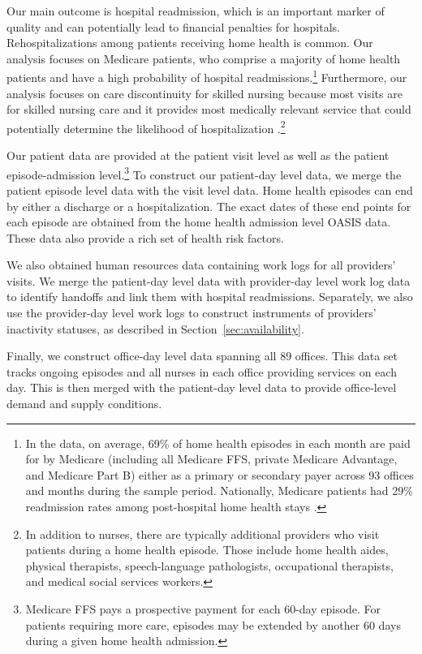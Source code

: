 \documentclass[final,12pt, notitlepage]{article}
\begin{document}
Our main outcome is hospital readmission, which is an important marker of quality and can potentially lead to financial penalties for hospitals. Rehospitalizations among patients receiving home health is common. Our analysis focuses on Medicare patients, who comprise a majority of home health patients and have a high probability of hospital readmissions.\footnote{In the data, on average, 69\% of home health episodes in each month are paid for by Medicare (including all Medicare FFS, private Medicare Advantage, and Medicare Part B) either as a primary or secondary payer across 93 offices and months during the sample period.
Nationally, Medicare patients had 29\% readmission rates among post-hospital home health stays \citep{MedPAC2014hh}.
}
Furthermore, our analysis focuses on care discontinuity for skilled nursing because most visits are for skilled nursing care and it provides most medically relevant service that could potentially determine the likelihood of hospitalization \citep{Russell2011}.\footnote{In addition to nurses, there are typically additional providers who visit patients during a home health episode. Those include home health aides, physical therapists, speech-language pathologists, occupational therapists, and medical social services workers.
}

Our patient data are provided at the patient visit level as well as the patient episode-admission level.\footnote{Medicare FFS pays a prospective payment for each 60-day episode. For patients requiring more care, episodes may be extended by another 60 days during a given home health admission.
}
To construct our patient-day level data, we merge the patient episode level data with the visit level data. Home health episodes can end by either a discharge or a hospitalization.
The exact dates of these end points for each episode are obtained from the home health admission level OASIS data. These data also provide a rich set of health risk factors.

We also obtained human resources data containing work logs for all providers' visits.
We merge the patient-day level data with provider-day level work log data to identify handoffs and link them with hospital readmissions.
Separately, we also use the provider-day level work logs to construct instruments of providers' inactivity statuses, as described in Section~\ref{sec:availability}.

Finally, we construct office-day level data spanning all 89 offices. This data set tracks ongoing episodes and all nurses in each office providing services on each day. This is then merged with the patient-day level data to provide office-level demand and supply conditions.
\end{document}
